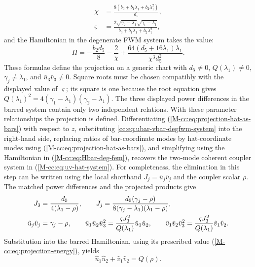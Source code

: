 \documentclass[11pt,a4paper]{article}
\newcommand{\externaleqref}[1]{\textup{(\ref*{#1})}}
\begin{document}
\begin{align}
  \chi &= \frac{8 \left( {b}_{0} + {b}_{1} {\lambda}_{1} + {b}_{2} {\lambda}_{1}^{2} \right)}{{d}_{5}}, \\
  \varsigma &= \frac{2 \sqrt{{\gamma}_{2} - {\lambda}_{1}} \sqrt{{\gamma}_{1} - {\lambda}_{1}}}{{b}_{0} + {b}_{1} {\lambda}_{1} + {b}_{2} {\lambda}_{1}^{2}},
\end{align}
and the Hamiltonian in the degenerate FWM system takes the value:
\begin{equation}
  \bar{H} = - \frac{{b}_{2} {d}_{5}}{8} - \frac{2}{\chi} + \frac{64 \left({d}_{5} + 16 {\lambda}_{1}\right) {\lambda}_{1}}{\chi^{3} {d}_{5}^{2}}.
\end{equation}
These formulae define the projection on a generic chart with $d_5\ne0$, $Q(\lambda_1)\ne0$, $\gamma_j\ne\lambda_1$, and $\bar u_3\bar v_3\ne0$.
Square roots must be chosen compatibly with the displayed value of $\varsigma$; its square is one because the root equation gives $Q(\lambda_1)^2=4(\gamma_1-\lambda_1)(\gamma_2-\lambda_1)$.
The three displayed power differences in the barred system contain only two independent relations.
With these parameter relationships the projection is defined. Differentiating \externaleqref{M-cc:eq:projection-hat-as-bars} with respect to $z$, substituting \eqref{cc:eq:ubar-vbar-degfwm-system} into the right-hand side, replacing ratios of bar-coordinate modes by hat-coordinate modes using \externaleqref{M-cc:eq:projection-hat-as-bars}, and simplifying using the Hamiltonian in \externaleqref{M-cc:eq:Hbar-deg-fem}, recovers the two-mode coherent coupler system in \externaleqref{M-cc:eq:uv-hat-system}.
For completeness, the elimination in this step can be written using the local shorthand $J_j=\bar u_j\bar v_j$ and the coupler scalar $\rho$.
The matched power differences and the projected products give
\begin{align}
J_3&=\frac{d_5}{4(\lambda_1-\rho)},\qquad
J_j=\frac{d_5(\gamma_j-\rho)}{8(\gamma_j-\lambda_1)(\lambda_1-\rho)},\notag\\
\hat u_j\hat v_j&=\gamma_j-\rho,\qquad
\bar u_1\bar u_2\bar u_3^2
=\frac{\varsigma J_3^2}{Q(\lambda_1)}\hat u_1\hat u_2,\qquad
\bar v_1\bar v_2\bar v_3^2
=\frac{\varsigma J_3^2}{Q(\lambda_1)}\hat v_1\hat v_2.
\label{cc:eq:projection-elimination}
\end{align}
Substitution into the barred Hamiltonian, using its prescribed value \externaleqref{M-cc:eq:projection-energy}, yields
\begin{equation}
\hat u_1\hat u_2+\hat v_1\hat v_2=Q(\rho).
\label{cc:eq:projection-product-sum}
\end{equation}
\end{document}
